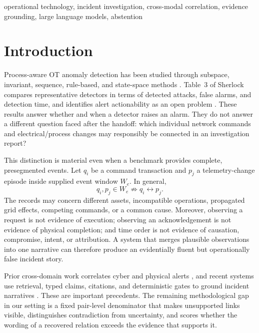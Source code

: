 \documentclass[conference]{IEEEtran}
\begin{document}
\begin{IEEEkeywords}
operational technology, incident investigation, cross-modal correlation, evidence grounding, large language models, abstention
\end{IEEEkeywords}

\section{Introduction}

Process-aware OT anomaly detection has been studied through subspace, invariant, sequence, rule-based, and state-space methods \cite{aoudi2018pasad,feng2019invariants,kim2020seq2seq,wolsing2022simple,wolsing2025geco}. Table~3 of Sherlock compares representative detectors in terms of detected attacks, false alarms, and detection time, and identifies alert actionability as an open problem \cite{wagner2025sherlock}. These results answer whether and when a detector raises an alarm. They do not answer a different question faced after the handoff: which individual network commands and electrical/process changes may responsibly be connected in an investigation report?

This distinction is material even when a benchmark provides complete, presegmented events. Let $q_i$ be a command transaction and $p_j$ a telemetry-change episode inside supplied event window $W_e$. In general,
\begin{equation}
q_i,p_j\in W_e \not\Rightarrow q_i\leftrightarrow p_j.
\end{equation}
The records may concern different assets, incompatible operations, propagated grid effects, competing commands, or a common cause. Moreover, observing a request is not evidence of execution; observing an acknowledgement is not evidence of physical completion; and time order is not evidence of causation, compromise, intent, or attribution. A system that merges plausible observations into one narrative can therefore produce an evidentially fluent but operationally false incident story.

Prior cross-domain work correlates cyber and physical alerts \cite{koucham2022crossdomain}, and recent systems use retrieval, typed claims, citations, and deterministic gates to ground incident narratives \cite{cadet2026retrieval,sheikhi2025cognitive,dehing2026structured,zhou2026eviguard}. These are important precedents. The remaining methodological gap in our setting is a fixed pair-level denominator that makes unsupported links visible, distinguishes contradiction from uncertainty, and scores whether the wording of a recovered relation exceeds the evidence that supports it.
\end{document}
